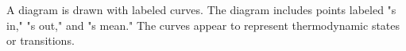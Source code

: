 A diagram is drawn with labeled curves.  
The diagram includes points labeled "s in," "s out," and "s mean."  
The curves appear to represent thermodynamic states or transitions.